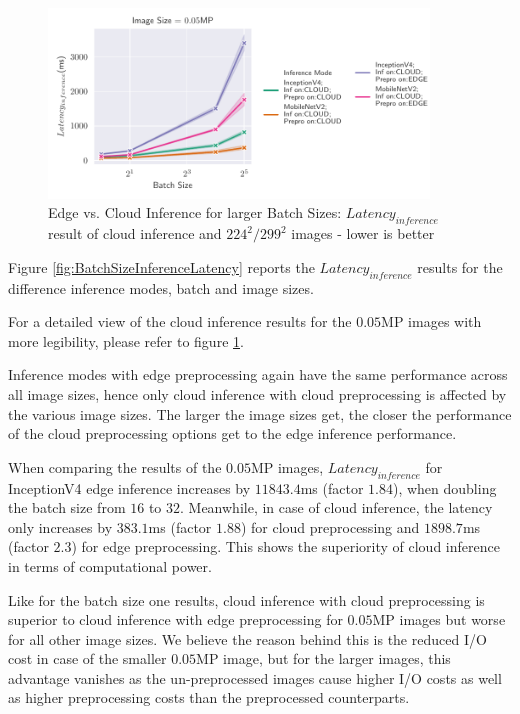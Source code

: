\begin{figure}[H]
\centering
\includegraphics[width=0.9\textwidth]{./Bilder/single_plots/batch_size_plots/Effects_of_Batch_size_Inference_Latencies_only_CLOUD_NR.pdf}
\caption{Edge vs.  Cloud Inference for larger Batch Sizes: $Latency_{inference}$ result of cloud inference and $224^2/299^2$ images - lower is better}
\label{fig:BatchSizeLatenciesCloud}
\end{figure}

Figure \ref{fig:BatchSizeInferenceLatency} reports the $Latency_{inference}$ results for the difference inference modes, batch and image sizes.

For a detailed view of the cloud inference results for the $0.05$MP images with more legibility, please refer to figure \ref{fig:BatchSizeLatenciesCloud}.

Inference modes with edge preprocessing again have the same performance across all image sizes, hence only cloud inference with cloud preprocessing is affected by the various image sizes.
The larger the image sizes get, the closer the performance of the cloud preprocessing options get to the edge inference performance.

When comparing the results of the $0.05$MP images, $Latency_{inference}$ for InceptionV4 edge inference  increases by $11843.4$ms (factor $1.84$), when doubling the batch size from $16$ to $32$.
Meanwhile, in case of cloud inference, the latency only increases by $383.1$ms (factor $1.88$) for cloud preprocessing and $1898.7$ms (factor $2.3$) for edge preprocessing.
This shows the superiority of cloud inference in terms of computational power.

Like for the batch size one results, cloud inference with cloud preprocessing is superior to cloud inference with edge preprocessing for $0.05$MP images but worse for all other image sizes.
We believe the reason behind this is the reduced I/O cost in case of the smaller $0.05$MP image, but for the larger images, this advantage vanishes as the un-preprocessed images cause higher I/O costs as well as higher preprocessing costs than the preprocessed counterparts.

